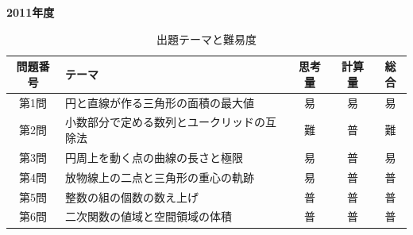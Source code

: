 \documentclass[../../main.tex]{subfiles}
\begin{document}
\begin{center}
  {\fontsize{48pt}{58pt}\selectfont \textbf{2011}\normalsize\textbf{年度}}
\end{center}

\begin{table}[htb]
  \centering
  \caption{出題テーマと難易度}
  \begin{tabular}{|c|p{6.2cm}|c|c|c|}
    \hline
    \textbf{問題番号} & \textbf{テーマ} & \textbf{思考量} & \textbf{計算量} & \textbf{総合} \\
    \hline
    第1問 & 円と直線が作る三角形の面積の最大値 & 易 & 易 & 易 \\
    \hline
    第2問 & 小数部分で定める数列とユークリッドの互除法 & 難 & 普 & 難 \\
    \hline
    第3問 & 円周上を動く点の曲線の長さと極限 & 易 & 普 & 易 \\
    \hline
    第4問 & 放物線上の二点と三角形の重心の軌跡 & 易 & 普 & 普 \\
    \hline
    第5問 & 整数の組の個数の数え上げ & 普 & 普 & 普 \\
    \hline
    第6問 & 二次関数の値域と空間領域の体積 & 普 & 普 & 普 \\
    \hline
  \end{tabular}
\end{table}
\end{document}
